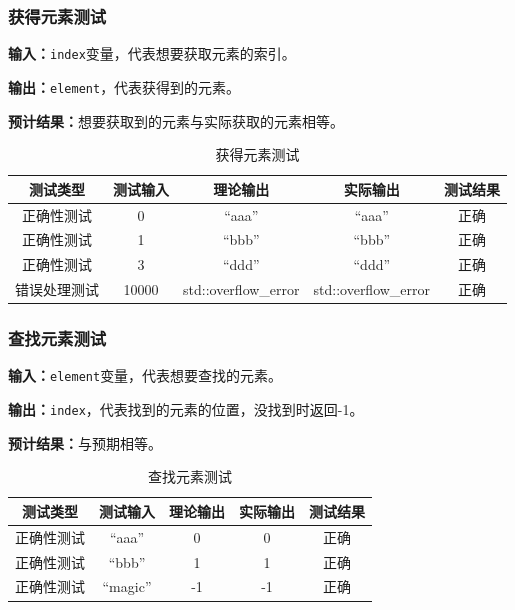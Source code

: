 \subsubsection{获得元素测试}
\textbf{输入：}\texttt{index}变量，代表想要获取元素的索引。
\par
\textbf{输出：}\texttt{element}，代表获得到的元素。
\par
\textbf{预计结果：}想要获取到的元素与实际获取的元素相等。
\begin{table}[h]
    \centering
    \caption{获得元素测试}
    \begin{tabular}{@{}ccccc@{}}
        \toprule
        \multicolumn{1}{c}{测试类型}    & \multicolumn{1}{c}{测试输入} & \multicolumn{1}{c}{理论输出} & \multicolumn{1}{c}{实际输出} &
        \multicolumn{1}{c}{测试结果} \\ \midrule
        \multicolumn{1}{c|}{正确性测试}  & 0&``aaa''&``aaa''&正确\\
        \multicolumn{1}{c|}{正确性测试}  & 1&``bbb''&``bbb''&正确\\
        \multicolumn{1}{c|}{正确性测试}  & 3&``ddd''&``ddd''&正确\\
        \multicolumn{1}{c|}{错误处理测试} & 10000& std::overflow\_error& std::overflow\_error& 正确\\ \bottomrule
    \end{tabular}
    \label{tab:gettest1}
\end{table}

\subsubsection{查找元素测试}
\textbf{输入：}\texttt{element}变量，代表想要查找的元素。
\par
\textbf{输出：}\texttt{index}，代表找到的元素的位置，没找到时返回-1。
\par
\textbf{预计结果：}与预期相等。
\begin{table}[h]
    \centering
    \caption{查找元素测试}
    \begin{tabular}{@{}ccccc@{}}
        \toprule
        \multicolumn{1}{c}{测试类型}    & \multicolumn{1}{c}{测试输入} & \multicolumn{1}{c}{理论输出} & \multicolumn{1}{c}{实际输出} &
        \multicolumn{1}{c}{测试结果} \\ \midrule
        \multicolumn{1}{c|}{正确性测试}  & ``aaa''&0&0&正确\\
        \multicolumn{1}{c|}{正确性测试}  & ``bbb''&1&1&正确\\
        \multicolumn{1}{c|}{正确性测试}  & ``magic''&-1&-1&正确\\ \bottomrule
    \end{tabular}
    \label{tab:locatetest1}
\end{table}


